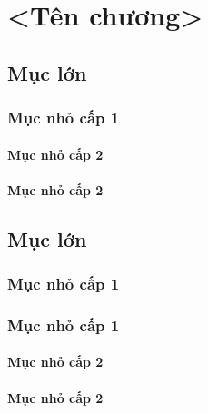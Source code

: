 \chapter{<Tên chương>}

\section{Mục lớn}
\subsection{Mục nhỏ cấp 1}
\subsubsection{Mục nhỏ cấp 2}
\subsubsection{Mục nhỏ cấp 2}

\section{Mục lớn}
\subsection{Mục nhỏ cấp 1}
\subsection{Mục nhỏ cấp 1}
\subsubsection{Mục nhỏ cấp 2}
\subsubsection{Mục nhỏ cấp 2}
